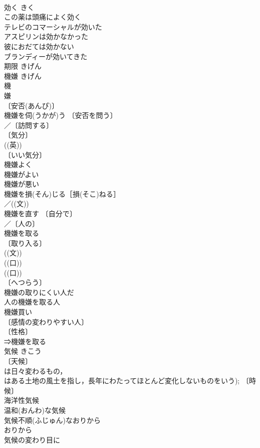 \documentclass[8pt]{extreport}
\begin{document}
\begin{CJK}{UTF8}{min}
\\	効く	きく	
\\	この薬は頭痛によく効く 
\\	テレビのコマーシャルが効いた 
\\	アスピリンは効かなかった 
\\	彼におだては効かない 
\\	ブランディーが効いてきた 
\\	期限	きげん	
\\	機嫌	きげん	
\\	機　 
\\	嫌 
\\	〔安否(あんぴ)〕
\\	機嫌を伺(うかが)う 〔安否を問う〕
\\	／〔訪問する〕
\\	〔気分〕
\\	((英)) 
\\	〔いい気分〕
\\	機嫌よく 
\\	機嫌がよい 
\\	機嫌が悪い 
\\	機嫌を損(そん)じる［損(そこ)ねる］ 
\\	／((文)) 
\\	機嫌を直す 〔自分で〕
\\	／〔人の〕
\\	機嫌を取る 
\\	〔取り入る〕
\\	((文)) 
\\	((口)) 
\\	((口)) 
\\	〔へつらう〕
\\	機嫌の取りにくい人だ 
\\	人の機嫌を取る人 
\\	機嫌買い 
\\	〔感情の変わりやすい人〕
\\	〔性格〕
\\	⇒機嫌を取る
\\	気候	きこう	
\\	〔天候〕
\\	は日々変わるもの，
\\	はある土地の風土を指し，長年にわたってほとんど変化しないものをいう); 〔時候〕
\\	海洋性気候 
\\	温和(おんわ)な気候 
\\	気候不順(ふじゅん)なおりから 
\\	おりから 
\\	気候の変わり目に 

\end{CJK}
\end{document}

